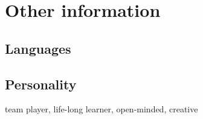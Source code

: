 \documentclass[letterpaper]{cv} %
\begin{document}
\section{Other information}

\subsection{Languages}
\begin{twentyshort} %
\end{twentyshort}

\subsection{Personality}
team player, life-long learner, open-minded, creative



%




\end{document}
